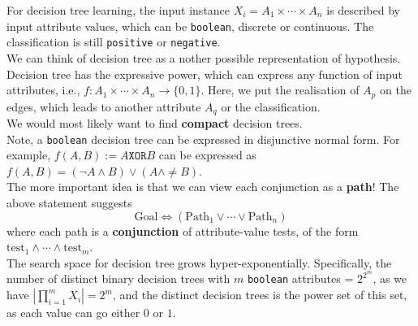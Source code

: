 \documentclass[12pt]{article}
\theoremstyle{definition}
\begin{document}
For decision tree learning, the input instance $X_i=A_1\times \cdots\times A_n$ is described by input attribute values, which can be \texttt{boolean}, discrete or continuous. The classification is still \texttt{positive} or \texttt{negative}.\\
We can think of decision tree as a nother possible representation of hypothesis.\\
Decision tree has the expressive power, which can express any function of input attributes, i.e., $f: A_1\times\cdots\times A_n\to \{0,1\}$. Here, we put the realisation of $A_p$ on the edges, which leads to another attribute $A_q$ or the classification.\\
We would most likely want to find \textbf{compact} decision trees.\\
Note, a \texttt{boolean} decision tree can be expressed in disjunctive normal form. For example, $f(A,B):=A \texttt{XOR} B$ can be expressed as $f(A,B)=(\neg A\land B)\lor (A\land \neq B)$.\\
The more important idea is that we can view each conjunction as a \textbf{path}! The above statement suggests
\[
\text{Goal} \Leftrightarrow (\text{Path}_1\lor\cdots\lor \text{Path}_n)
\]
where each path is a \textbf{conjunction} of attribute-value tests, of the form $\text{test}_1\land \cdots\land \text{test}_m$.\\
The search space for decision tree grows hyper-exponentially. Specifically, the number of distinct binary decision trees with $m$ \texttt{boolean} attributes = $2^{2^m}$, as we have $|\prod_{i=1}^m X_i|=2^m$, and the distinct decision trees is the power set of this set, as each value can go either $0$ or $1$.\\
\end{document}
